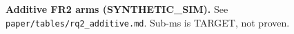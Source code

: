 \textbf{Additive FR2 arms (SYNTHETIC\_SIM).} See \texttt{paper/tables/rq2\_additive.md}. Sub-ms is TARGET, not proven.
